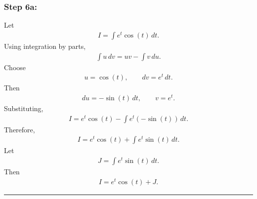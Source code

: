 \documentclass[letterpaper,10pt,english]{sphinxmanual}
\begin{document}
\subsubsection{Step 6a:}
\label{\detokenize{Language/Science_language/ODE_calculus/course_MATH_3035/homework_assignments/index_pdf:step-6a}}
\sphinxAtStartPar
Let
\begin{equation*}
\begin{split}I=\int e^t\cos(t)\,dt.\end{split}
\end{equation*}
\sphinxAtStartPar
Using integration by parts,
\begin{equation*}
\begin{split}\int u\,dv = uv-\int v\,du.\end{split}
\end{equation*}
\sphinxAtStartPar
Choose
\begin{equation*}
\begin{split}u=\cos(t),
\qquad
dv=e^t\,dt.\end{split}
\end{equation*}
\sphinxAtStartPar
Then
\begin{equation*}
\begin{split}du=-\sin(t)\,dt,
\qquad
v=e^t.\end{split}
\end{equation*}
\sphinxAtStartPar
Substituting,
\begin{equation*}
\begin{split}I=e^t\cos(t)-\int e^t(-\sin(t))\,dt.\end{split}
\end{equation*}
\sphinxAtStartPar
Therefore,
\begin{equation*}
\begin{split}I=e^t\cos(t)+\int e^t\sin(t)\,dt.\end{split}
\end{equation*}
\sphinxAtStartPar
Let
\begin{equation*}
\begin{split}J=\int e^t\sin(t)\,dt.\end{split}
\end{equation*}
\sphinxAtStartPar
Then
\begin{equation*}
\begin{split}I=e^t\cos(t)+J.\end{split}
\end{equation*}

\bigskip\hrule\bigskip
\end{document}
